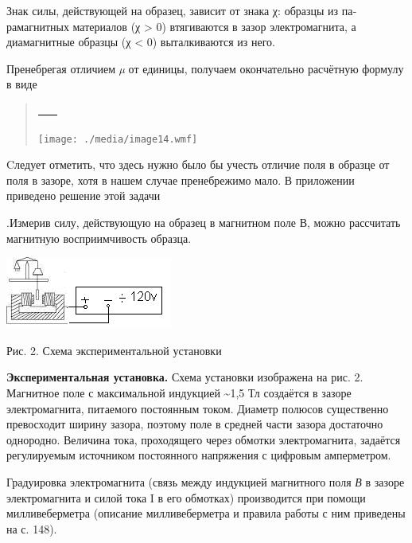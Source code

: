 \documentclass[]{article}
\begin{document}
Знак силы, действующей на образец, зависит от знака χ: образцы из
па­рамагнитных материалов (χ \textgreater{} 0) втягиваются в зазор
электромагнита, а диамагнитные образцы (χ \textless{} 0) выталкиваются
из него.

Пренебрегая отличием \emph{µ} от единицы, получаем окончательно
рас­чётную формулу в виде

\begin{quote}
\includegraphics{./media/image13.png}

\texttt{[image: ./media/image14.wmf]}
\end{quote}

Cледует отметить, что здесь нужно было бы учесть отличие поля в образце
от поля в зазоре, хотя в нашем случае пренебрежимо мало. В приложении
приведено решение этой задачи

.Измерив силу, действующую на образец в магнитном поле В, можно
рассчитать магнитную восприимчивость образца.

\includegraphics{./media/image15.png}

Рис. 2. Схема экспериментальной установки

\textbf{Экспериментальная установка.} Схема установки изображена на рис.
2. Магнитное поле с максимальной индукцией \textasciitilde{}1,5 Тл
создаётся в зазоре электромагнита, питаемого постоянным током. Диаметр
полю­сов существенно превосходит ширину зазора, поэтому поле в средней
части зазора достаточно однородно. Величина тока, проходящего через
обмотки электромагнита, задаётся регулируемым источником постоянного
напряжения с цифровым амперметром.

Градуировка электромагнита (связь между индукцией магнитного поля
\emph{В} в зазоре электромагнита и силой тока I в его обмотках)
про­изводится при помощи милливеберметра (описание милливеберметра и
правила работы с ним приведены на с. 148).
\end{document}
